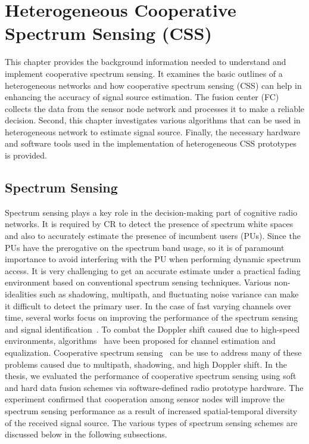 \chapter{Heterogeneous Cooperative Spectrum Sensing (CSS)}
\label{chapter3}

This chapter provides the background information needed to understand and implement cooperative spectrum sensing. It examines the basic outlines of a heterogeneous networks and how cooperative spectrum sensing (CSS) can help in enhancing the accuracy of signal source estimation. The fusion center (FC) collects the data from the sensor node network and processes it to make a reliable decision. Second, this chapter investigates various algorithms that can be used in heterogeneous network to estimate signal source. Finally, the necessary hardware and software tools used in the implementation of heterogeneous CSS prototypes is provided.

\section{Spectrum Sensing}
Spectrum sensing plays a key role in the decision-making part of cognitive radio networks. It is required by CR to detect the presence of spectrum white spaces and also to accurately estimate the presence of incumbent users (PUs). Since the PUs have  the prerogative on the spectrum band usage, so it is of paramount importance to avoid interfering with the PU when performing dynamic spectrum access. It is very challenging to get an accurate estimate under a practical fading environment based on conventional spectrum sensing techniques. Various non-idealities such as shadowing, multipath, and fluctuating noise variance can make it difficult to detect the primary user. In the case of fast  varying  channels over time, several works focus on improving the performance of the spectrum sensing and signal identification~\cite{hassan2012blind,kharbech2013blind,hassan2009automatic}. To combat the Doppler shift caused due to high-speed environments, algorithms~\cite{simon2013iterative} have been proposed for channel estimation and equalization. Cooperative spectrum sensing~\cite{ksgill} can be use to address many of these problems caused due to multipath, shadowing, and high Doppler shift. In the thesis, we evaluated the performance of cooperative spectrum sensing using soft and hard data fusion schemes via software-defined radio prototype hardware. The experiment confirmed that cooperation among sensor nodes will improve the spectrum sensing performance as a result of increased spatial-temporal diversity of the received signal source. The various types of spectrum sensing schemes are discussed below in the following subsections.

